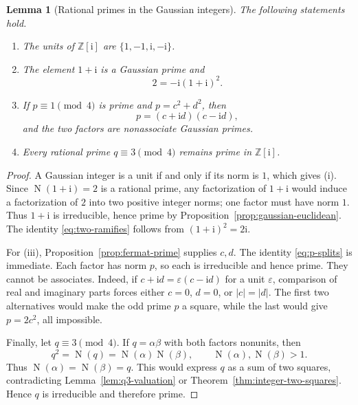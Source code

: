 \documentclass[11pt,a4paper]{article}
\numberwithin{equation}{section}
\newtheorem{lemma}[theorem]{Lemma}
\theoremstyle{definition}
\newcommand{\Z}{\mathbb{Z}}
\newcommand{\N}{\operatorname{N}}
\newcommand{\ii}{\mathrm{i}}
\begin{document}
\begin{lemma}[Rational primes in the Gaussian integers]
\label{lem:gaussian-primes}
The following statements hold.
\begin{enumerate}
\item The units of $\Z[\ii]$ are $\{1,-1,\ii,-\ii\}$.
\item The element $1+\ii$ is a Gaussian prime and
\begin{equation}
 2=-\ii(1+\ii)^2.
 \label{eq:two-ramifies}
\end{equation}
\item If $p\equiv1\pmod4$ is prime and $p=c^2+d^2$, then
\begin{equation}
 p=(c+\ii d)(c-\ii d),
 \label{eq:p-splits}
\end{equation}
and the two factors are nonassociate Gaussian primes.
\item Every rational prime $q\equiv3\pmod4$ remains prime in $\Z[\ii]$.
\end{enumerate}
\end{lemma}

\begin{proof}
A Gaussian integer is a unit if and only if its norm is $1$, which gives (i). Since $\N(1+\ii)=2$ is a rational prime, any factorization of $1+\ii$ would induce a factorization of $2$ into two positive integer norms; one factor must have norm $1$. Thus $1+\ii$ is irreducible, hence prime by Proposition~\ref{prop:gaussian-euclidean}. The identity \eqref{eq:two-ramifies} follows from $(1+\ii)^2=2\ii$.

For (iii), Proposition~\ref{prop:fermat-prime} supplies $c,d$. The identity \eqref{eq:p-splits} is immediate. Each factor has norm $p$, so each is irreducible and hence prime. They cannot be associates. Indeed, if $c+\ii d=\varepsilon(c-\ii d)$ for a unit $\varepsilon$, comparison of real and imaginary parts forces either $c=0$, $d=0$, or $|c|=|d|$. The first two alternatives would make the odd prime $p$ a square, while the last would give $p=2c^2$, all impossible.

Finally, let $q\equiv3\pmod4$. If $q=\alpha\beta$ with both factors nonunits, then
\[
 q^2=\N(q)=\N(\alpha)\N(\beta),
 \qquad
 \N(\alpha),\N(\beta)>1.
\]
Thus $\N(\alpha)=\N(\beta)=q$. This would express $q$ as a sum of two squares, contradicting Lemma~\ref{lem:q3-valuation} or Theorem~\ref{thm:integer-two-squares}. Hence $q$ is irreducible and therefore prime.
\end{proof}
\end{document}
